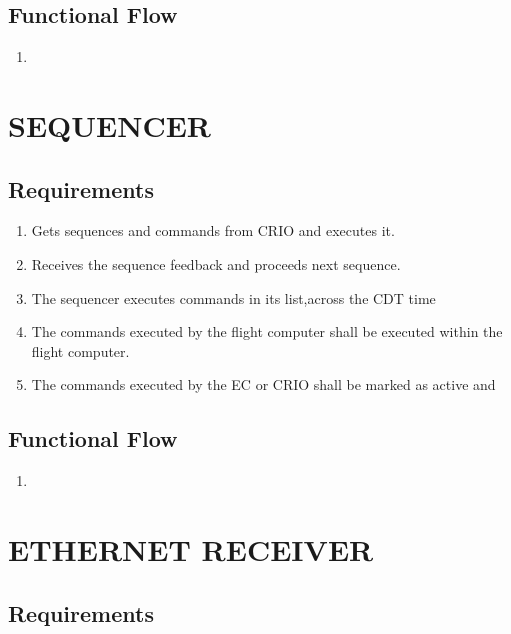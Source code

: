 \subsection{Functional Flow}

\begin{enumerate}
	\item 
	
\end{enumerate}


\newpage

\section{SEQUENCER}
\subsection{Requirements}

\begin{enumerate}
	\item Gets sequences and commands from CRIO and executes it.
	\item Receives the sequence feedback and proceeds next sequence.
	\item The sequencer executes commands in its list,across the CDT time
	\item The commands executed by the flight computer shall be executed within the flight computer.
	\item The commands executed by the EC or CRIO shall be marked as active and 

\end{enumerate}

\subsection{Functional Flow}

\begin{enumerate}
	\item 
	
\end{enumerate}


\newpage

\section{ETHERNET RECEIVER}
\subsection{Requirements}

